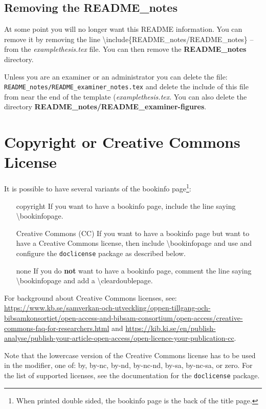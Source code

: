 \documentclass[examplethesis.tex]{subfiles}
\begin{document}
\subsection{Removing the README\_notes}
At some point you will no longer want this README information. You can remove it by removing the line
\textbackslash include\{README\_notes/README\_notes\} -- from the \textit{examplethesis.tex} file. You can then remove the \textbf{README\_notes} directory.

Unless you are an examiner or an administrator you can delete the file: \texttt{README\_notes/README\_examiner\_notes.tex} and delete the include of this file from near the end of the template (\ie \textit{examplethesis.tex}. You can also delete the directory \textbf{README\_notes/README\_examiner-figures}.


\section[Copyright or Creative Commons License]{Copyright or Creative Commons\\ License}
\label{sec:copyrightOrCClicense}
It is possible to have several variants of the bookinfo page\footnote{When printed double sided, the bookinfo page is the back of the title page.}:
\begin{enumerate}[labelwidth =\widthof{\textbf{Creative Commons (CC)}}, leftmargin = !]
    \item[copyright] If you want to have a bookinfo page, include the line saying \textbackslash bookinfopage.
    \item[Creative Commons (CC)] If you want to have a bookinfo page but want to have a Creative Commons license, then include \textbackslash bookinfopage and use and configure the \texttt{doclicense} package as described below.
    \item[none] If you do \textbf{not} want to have a bookinfo page, comment the line saying \textbackslash bookinfopage and add a \textbackslash cleardoublepage.
\end{enumerate}

For background about Creative Commons licenses, see:
\url{https://www.kb.se/samverkan-och-utveckling/oppen-tillgang-och-bibsamkonsortiet/open-access-and-bibsam-consortium/open-access/creative-commons-faq-for-researchers.html} and \url{https://kib.ki.se/en/publish-analyse/publish-your-article-open-access/open-licence-your-publication-cc}.

Note that the lowercase version of the Creative Commons license has to be used in the modifier, \ie one of: by, by-nc, by-nd, by-nc-nd, by-sa, by-nc-sa, or zero. For the list of supported licenses, see the documentation for the \texttt{doclicense} package.
\end{document}
